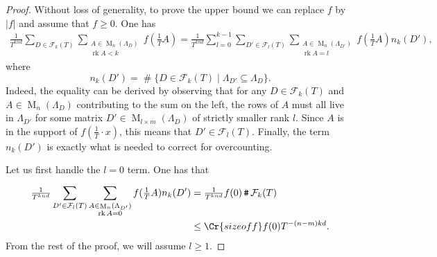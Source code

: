 \documentclass{amsart}
\newcommand{\vlad}{\color{brown}}
\theoremstyle{definition}
\theoremstyle{remark}
\DeclareMathOperator{\M}{M}
\DeclareMathOperator{\card}{\texttt{\#}}
\DeclareMathOperator{\rank}{rk}
\begin{document}
\begin{proof}
    Without loss of generality, to prove the upper bound we can replace $f$ by $|f|$ and assume that $f \geq 0$.
    One has
    \begin{align}
        \tfrac{1}{T^{knd}} \sum_{D \in \mathcal{F}_{k}{(T)}} \sum_{\substack{A \in \M_{n}(\Lambda_{D}) \\ \rank A < k }}^{}  
        f(\tfrac{1}{T} A )
        = 
        \tfrac{1}{T^{knd}} \sum_{l=0}^{k-1} \sum_{D' \in \mathcal{F}_{l}{(T)}}^{} \sum_{\substack{A \in \M_{n}(\Lambda_{D'}) \\ \rank A = l }}^{}  
        f(\tfrac{1}{T}A) n_{k}(D'),
    \end{align}
    where 
    \begin{equation}
        n_{k}(D') = \card\{D \in \mathcal{F}_{k}{(T)}  \mid \Lambda_{D'} \subseteq \Lambda_{D} \}.
    \end{equation}
    Indeed, the equality can be derived by observing that for any $D \in \mathcal{F}_{k}(T)$ and $A \in \M_{n}(\Lambda_{D})$ contributing to the sum on the left, the rows of $A$ must all live in $\Lambda_{D'}$ for some matrix $D' \in \M_{l \times m}(\Lambda_{D})$ of strictly smaller rank $l$. Since $A$ is in the support of $f(\tfrac{1}{T} \cdot x )$, this means that $D' \in \mathcal{F}_{l}(T)$. Finally, the term $n_{k}(D')$ is exactly what is needed to correct for overcounting.


    Let us first handle the $l=0$ term. One has that 
\begin{align}
        \tfrac{1}{T^{knd}}  \sum_{D' \in \mathcal{F}_{l}{(T)}}^{} \sum_{\substack{A \in \M_{n}(\Lambda_{D'}) \\ \rank A = 0 }}^{}   
        f(\tfrac{1}{T}A) n_{k}(D') 
         & = 
        \tfrac{1}{T^{knd}}  f(0 ) \card \mathcal{F}_{k}(T)  \\ 
     &   \leq \Cr{sizeoff} f(0) T^{-(n-m)kd}.
\end{align}
From the rest of the proof, we will assume $l \geq 1$.


\end{proof}
\end{document}
